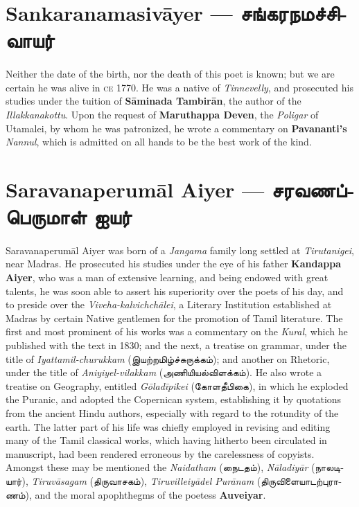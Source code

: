 \documentclass{article}
\newcommand{\TamilText}[1]{\texttamil{#1}}
\newcommand{\TamilBold}[1]{\texttamil{\textbf{#1}}}
\newcommand{\tam}[1]{\TamilText{#1}}
\newcommand{\tambold}[1]{\TamilBold{#1}}
\begin{document}
\section{Sankaranamasiv\={a}yer --- \tambold{சங்கரநமச்சிவாயர்}}
\paragraph{}
Neither the date of the birth, nor the death of this poet is known; but we are certain he was alive in \textsc{ce} 1770. He was a native of \emph{Tinnevelly}, and prosecuted his studies under the tuition of \textbf{S\={a}minada Tambir\={a}n}, the author of the \emph{Illakkanakottu}. Upon the request of \textbf{Maruthappa Deven}, the \emph{Poligar} of Utamalei, by whom he was patronized, he wrote a commentary on \textbf{Pavananti's} \emph{Nannul}, which is admitted on all hands to be the best work of the kind.

\section{Saravanaperum\={a}l Aiyer --- \tambold{சரவணப்பெருமாள் ஐயர்}}
\paragraph{}
Saravanaperum\={a}l Aiyer was born of a \emph{Jangama} family long settled at \emph{Tirutanigei}, near Madras. He prosecuted his studies under the eye of his father \textbf{Kandappa Aiyer}, who was a man of extensive learning, and being endowed with great talents, he was soon able to assert his superiority over the poets of his day, and to preside over the \emph{Viveha-kalvichch\={a}lei}, a Literary Institution established at Madras by certain Native gentlemen for the promotion of Tamil literature. The first and most prominent of his works was a commentary on the \emph{Kural}, which he published with the text in 1830; and the next, a treatise on grammar, under the title of \emph{Iyattamil-churukkam} (\tam{இயற்றமிழ்ச்சுருக்கம்}); and another on Rhetoric, under the title of \emph{Aniyiyel-vilakkam} (\tam{அணியியல்விளக்கம்}). He also wrote a treatise on Geography, entitled \emph{G\={o}lad\={i}pikei} (\tam{கோளதீபிகை}), in which he exploded the Puranic, and adopted the Copernican system, establishing it by quotations from the ancient Hindu authors, especially with regard to the rotundity of the earth. The latter part of his life was chiefly employed in revising and editing many of the Tamil classical works, which having hitherto been circulated in manuscript, had been rendered erroneous by the carelessness of copyists. Amongst these may be mentioned the \emph{Naidatham} (\tam{நைடதம்}), \emph{N\={a}ladiy\={a}r} (\tam{நாலடியார்}), \emph{Tiruv\={a}sagam} (\tam{திருவாசகம்}), \emph{Tiruvilleiy\={a}del Pur\={a}nam} (\tam{திருவிளையாடற்புராணம்}), and the moral apophthegms of the poetess \textbf{Auveiyar}.
\end{document}
